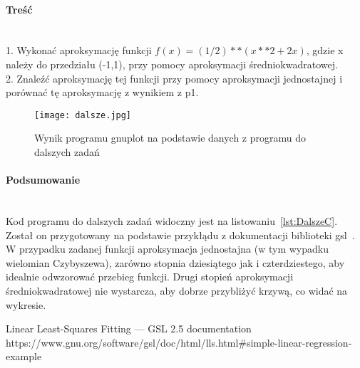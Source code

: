 \paragraph{Treść}~\\
1. Wykonać aproksymację funkcji $ f(x) = (1/2)**(x**2 + 2x) $, gdzie x należy do przedziału (-1,1), przy pomocy aproksymacji średniokwadratowej.\\
2. Znaleźć aproksymację tej funkcji przy pomocy aproksymacji jednostajnej i porównać tę aproksymację z wynikiem z p1.\\





\begin{figure}[p]
  \caption{Wynik programu gnuplot na podstawie danych z programu do dalszych zadań}
  \label{fig:DalszeJpg}
  \centering
  \texttt{[image: dalsze.jpg]}
\end{figure}

\paragraph{Podsumowanie}~\\
Kod programu do dalszych zadań widoczny jest na listowaniu~\ref{lst:DalszeC}.
Został on przygotowany na podstawie przykłądu z dokumentacji biblioteki gsl~\cite{LinearLeastSquaresFittingGSL25Documentation}.
W przypadku zadanej funkcji aproksymacja jednostajna (w tym wypadku wielomian Czybyszewa), zarówno stopnia dziesiątego jak i czterdziestego, aby idealnie odwzorować przebieg funkcji.
Drugi stopień aproksymacji średniokwadratowej nie wystarcza, aby dobrze przybliżyć krzywą, co widać na wykresie.

\begin{thebibliography}{9}
   Linear Least-Squares Fitting — GSL 2.5 documentation https://www.gnu.org/software/gsl/doc/html/lls.html\#simple-linear-regression-example
\end{thebibliography}
